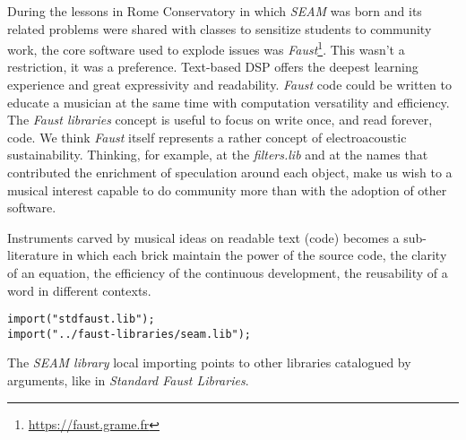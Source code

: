 \documentclass[twoside,a4paper]{article}
\begin{document}
During the lessons in Rome Conservatory in which \emph{SEAM} was born and its related problems were shared with classes to sensitize students to community work, the core software used to explode issues was \emph{Faust}\footnote{\url{https://faust.grame.fr}}. This wasn't a restriction, it was a preference. Text-based DSP offers the deepest learning experience and great expressivity and readability. \emph{Faust} code could be written to educate a musician at the same time with computation versatility and efficiency. The \emph{Faust libraries} concept is useful to focus on write once, and read forever, code. We think \emph{Faust} itself represents a rather concept of electroacoustic sustainability. Thinking, for example, at the \emph{filters.lib} and at the names that contributed the enrichment of speculation around each object, make us wish to a musical interest capable to do community more than with the adoption of other software.

Instruments carved by musical ideas on readable text (code) becomes a sub-literature in which each brick maintain the power of the source code, the clarity of an equation, the efficiency of the continuous development, the reusability of a word in different contexts.

\begin{lstlisting}
import("stdfaust.lib");
import("../faust-libraries/seam.lib");
\end{lstlisting}

The \emph{SEAM library} local importing points to other libraries catalogued by arguments, like in \emph{Standard Faust Libraries}.
\end{document}
